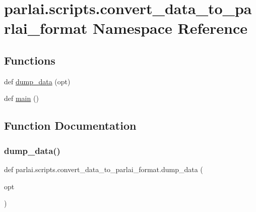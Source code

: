 \hypertarget{namespaceparlai_1_1scripts_1_1convert__data__to__parlai__format}{}\section{parlai.\+scripts.\+convert\+\_\+data\+\_\+to\+\_\+parlai\+\_\+format Namespace Reference}
\label{namespaceparlai_1_1scripts_1_1convert__data__to__parlai__format}
\subsection*{Functions}
\begin{DoxyCompactItemize}
\item 
def \hyperlink{namespaceparlai_1_1scripts_1_1convert__data__to__parlai__format_a4ed2278a6a86b341d814edbef295124c}{dump\+\_\+data} (opt)
\item 
def \hyperlink{namespaceparlai_1_1scripts_1_1convert__data__to__parlai__format_a1cdf007fb0ed5951c0dfb135500d47cd}{main} ()
\end{DoxyCompactItemize}


\subsection{Function Documentation}
\mbox{\label{namespaceparlai_1_1scripts_1_1convert__data__to__parlai__format_a4ed2278a6a86b341d814edbef295124c}} 
\subsubsection{\texorpdfstring{dump\+\_\+data()}{dump\_data()}}
{\footnotesize\ttfamily def parlai.\+scripts.\+convert\+\_\+data\+\_\+to\+\_\+parlai\+\_\+format.\+dump\+\_\+data (\begin{DoxyParamCaption}\item[{}]{opt }\end{DoxyParamCaption})}

